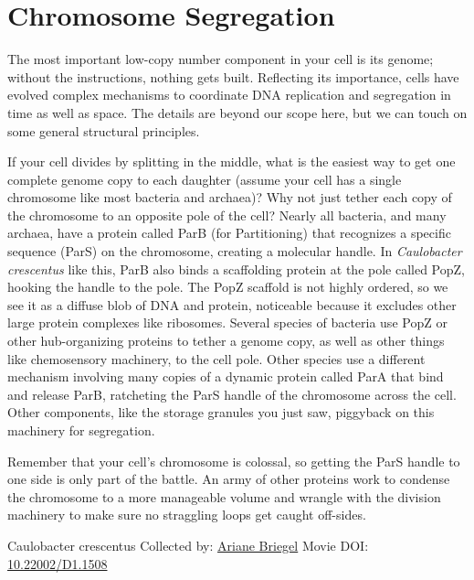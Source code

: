 \documentclass[]{tufte-book}
\begin{document}
\hypertarget{chromosome-segregation}{%
\section{Chromosome Segregation}\label{chromosome-segregation}}

The most important low-copy number component in your cell is its genome; without the instructions, nothing gets built. Reflecting its importance, cells have evolved complex mechanisms to coordinate DNA replication and segregation in time as well as space. The details are beyond our scope here, but we can touch on some general structural principles.

If your cell divides by splitting in the middle, what is the easiest way to get one complete genome copy to each daughter (assume your cell has a single chromosome like most bacteria and archaea)? Why not just tether each copy of the chromosome to an opposite pole of the cell? Nearly all bacteria, and many archaea, have a protein called ParB (for Partitioning) that recognizes a specific sequence (ParS) on the chromosome, creating a molecular handle. In \emph{Caulobacter crescentus} like this, ParB also binds a scaffolding protein at the pole called PopZ, hooking the handle to the pole. The PopZ scaffold is not highly ordered, so we see it as a diffuse blob of DNA and protein, noticeable because it excludes other large protein complexes like ribosomes. Several species of bacteria use PopZ or other hub-organizing proteins to tether a genome copy, as well as other things like chemosensory machinery, to the cell pole. Other species use a different mechanism involving many copies of a dynamic protein called ParA that bind and release ParB, ratcheting the ParS handle of the chromosome across the cell. Other components, like the storage granules you just saw, piggyback on this machinery for segregation.

Remember that your cell's chromosome is colossal, so getting the ParS handle to one side is only part of the battle. An army of other proteins work to condense the chromosome to a more manageable volume and wrangle with the division machinery to make sure no straggling loops get caught off-sides.



\hypertarget{htmlwidget-d34965c9000e18c97c06}{}

\label{fig:5-2}Caulobacter crescentus Collected by: \protect\hyperlink{ariane_briegel}{Ariane Briegel} Movie DOI: \href{https://doi.org/10.22002/D1.1508}{10.22002/D1.1508}
\end{document}
